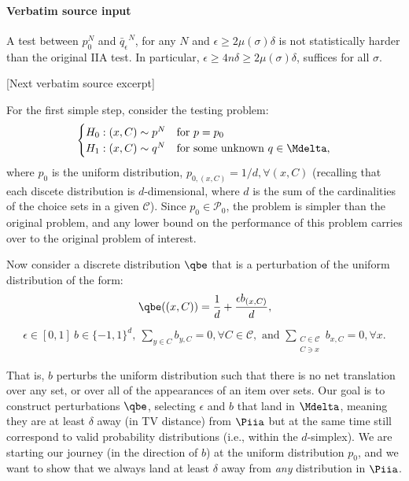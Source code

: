 \documentclass[10pt]{article}
\begin{document}
\paragraph{Verbatim source input}
\begin{ReviewVerbatim}
\begin{lemma}\label{lemma:seperation}
		A test between $p_0^N$ and ${\bar{q}_{\epsilon} }^N$, for any $N$ and $\epsilon \geq 2 \mu(\sigma) \delta$ is not statistically harder than the original IIA test. In particular, $ \epsilon \ge 4n \delta \geq 2\mu(\sigma)\delta$, suffices for all $\sigma$.
	\end{lemma}

[Next verbatim source excerpt]

	For the first simple step, consider the testing problem:
	\begin{align}
	\label{eq:test2}
	\begin{cases}
	H_0: (x, C) \sim p^N & \text{for } p = p_0 \\
	H_1: (x,C) \sim q^N & \text{for some unknown } q \in \Mdelta,
	\end{cases}
	\end{align}
	where $p_0$ is the uniform distribution, $p_{0,(x,C)} = 1/d, \forall (x,C)$ (recalling that each discete distribution is $d$-dimensional, where $d$ is the sum of the cardinalities of the choice sets in a given $\mathcal C$). Since $p_0 \in \mathcal{P}_0$, the problem is simpler than the original problem, and any lower bound on the performance of this problem carries over to the original problem of interest.

	Now consider a discrete distribution $\qbe$ that is a perturbation of the uniform distribution of the form:
	\begin{align*}
	\qbe((x,C)) = \frac{1}{d} + \frac{\epsilon b_{(x,C)}}{d},
	\end{align*}
	\begin{align*}
	\epsilon \in [0,1] \
	b \in \lbrace -1, 1 \rbrace^d,
	\
	\sum_{y \in C} b_{y,C} = 0, \forall C \in \mathcal C,
	\text{ and }
	\sum_{\substack{C \in \mathcal{C}\\ C \ni x}} b_{x,C} = 0, \forall x.
	\end{align*}

	That is, $b$ perturbs the uniform distribution such that there is no net translation over any set, or over all of the appearances of an item over sets. Our goal is to construct perturbations $\qbe$, selecting $\epsilon$ and $b$ that land in $\Mdelta$, meaning they are at least $\delta$ away (in TV distance) from $\Piia$ but at the same time still correspond to valid probability distributions (i.e., within the $d$-simplex). We are starting our journey (in the direction of $b$) at the uniform distribution $p_0$, and we want to show that we always land at least $\delta$ away from {\it any} distribution in $\Piia$.


\end{ReviewVerbatim}
\end{document}
